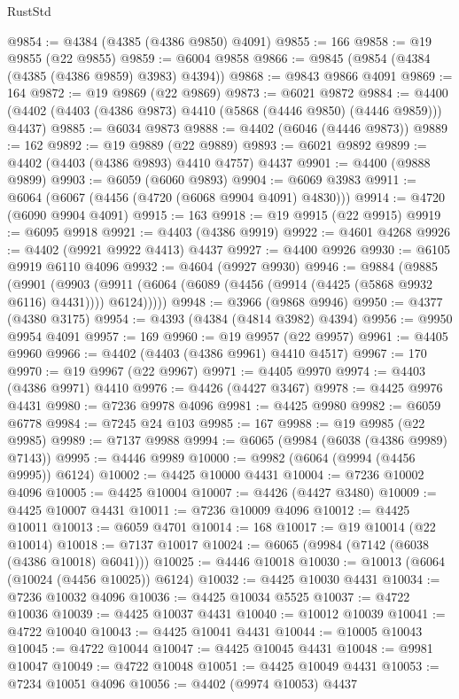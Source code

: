 \begin{lexlean}{RustStd}
\begin{coremodule}
@9854 := @4384 (@4385 (@4386 @9850) @4091)
@9855 := 166
@9858 := @19 @9855 (@22 @9855)
@9859 := @6004 @9858
@9866 := @9845 (@9854 (@4384 (@4385 (@4386 @9859) @3983) @4394))
@9868 := @9843 @9866 @4091
@9869 := 164
@9872 := @19 @9869 (@22 @9869)
@9873 := @6021 @9872
@9884 := @4400 (@4402 (@4403 (@4386 @9873) @4410 (@5868 (@4446 @9850) (@4446 @9859))) @4437)
@9885 := @6034 @9873
@9888 := @4402 (@6046 (@4446 @9873))
@9889 := 162
@9892 := @19 @9889 (@22 @9889)
@9893 := @6021 @9892
@9899 := @4402 (@4403 (@4386 @9893) @4410 @4757) @4437
@9901 := @4400 (@9888 @9899)
@9903 := @6059 (@6060 @9893)
@9904 := @6069 @3983
@9911 := @6064 (@6067 (@4456 (@4720 (@6068 @9904 @4091) @4830)))
@9914 := @4720 (@6090 @9904 @4091)
@9915 := 163
@9918 := @19 @9915 (@22 @9915)
@9919 := @6095 @9918
@9921 := @4403 (@4386 @9919)
@9922 := @4601 @4268
@9926 := @4402 (@9921 @9922 @4413) @4437
@9927 := @4400 @9926
@9930 := @6105 @9919 @6110 @4096
@9932 := @4604 (@9927 @9930)
@9946 := @9884
    (@9885
      (@9901
        (@9903 (@9911 (@6064 (@6089 (@4456 (@9914 (@4425 (@5868 @9932 @6116) @4431)))) @6124)))))
@9948 := @3966 (@9868 @9946)
@9950 := @4377 (@4380 @3175)
@9954 := @4393 (@4384 (@4814 @3982) @4394)
@9956 := @9950 @9954 @4091
@9957 := 169
@9960 := @19 @9957 (@22 @9957)
@9961 := @4405 @9960
@9966 := @4402 (@4403 (@4386 @9961) @4410 @4517)
@9967 := 170
@9970 := @19 @9967 (@22 @9967)
@9971 := @4405 @9970
@9974 := @4403 (@4386 @9971) @4410
@9976 := @4426 (@4427 @3467)
@9978 := @4425 @9976 @4431
@9980 := @7236 @9978 @4096
@9981 := @4425 @9980
@9982 := @6059 @6778
@9984 := @7245 @24 @103
@9985 := 167
@9988 := @19 @9985 (@22 @9985)
@9989 := @7137 @9988
@9994 := @6065 (@9984 (@6038 (@4386 @9989) @7143))
@9995 := @4446 @9989
@10000 := @9982 (@6064 (@9994 (@4456 @9995)) @6124)
@10002 := @4425 @10000 @4431
@10004 := @7236 @10002 @4096
@10005 := @4425 @10004
@10007 := @4426 (@4427 @3480)
@10009 := @4425 @10007 @4431
@10011 := @7236 @10009 @4096
@10012 := @4425 @10011
@10013 := @6059 @4701
@10014 := 168
@10017 := @19 @10014 (@22 @10014)
@10018 := @7137 @10017
@10024 := @6065 (@9984 (@7142 (@6038 (@4386 @10018) @6041)))
@10025 := @4446 @10018
@10030 := @10013 (@6064 (@10024 (@4456 @10025)) @6124)
@10032 := @4425 @10030 @4431
@10034 := @7236 @10032 @4096
@10036 := @4425 @10034 @5525
@10037 := @4722 @10036
@10039 := @4425 @10037 @4431
@10040 := @10012 @10039
@10041 := @4722 @10040
@10043 := @4425 @10041 @4431
@10044 := @10005 @10043
@10045 := @4722 @10044
@10047 := @4425 @10045 @4431
@10048 := @9981 @10047
@10049 := @4722 @10048
@10051 := @4425 @10049 @4431
@10053 := @7234 @10051 @4096
@10056 := @4402 (@9974 @10053) @4437

\end{coremodule}
\end{lexlean}
